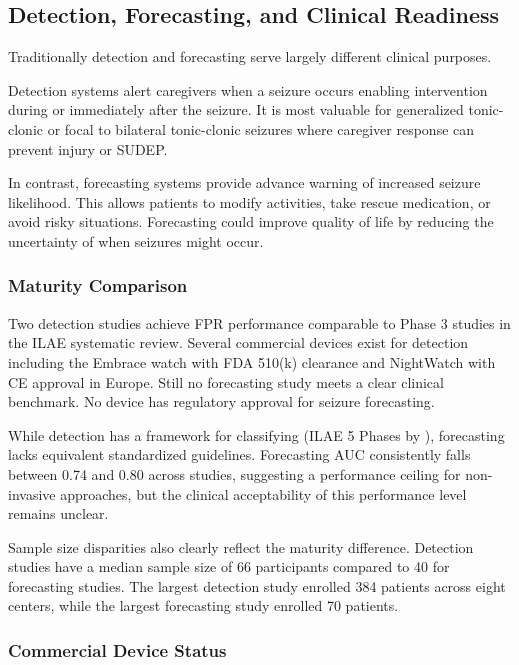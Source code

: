 \subsection{Detection, Forecasting, and Clinical Readiness}
\label{sec:detection-forecasting-readiness}

Traditionally detection and forecasting serve largely different clinical purposes.

Detection systems alert caregivers when a seizure occurs enabling intervention during or immediately after the seizure. It is most valuable for generalized tonic-clonic or focal to bilateral tonic-clonic seizures where caregiver response can prevent injury or SUDEP.

In contrast, forecasting systems provide advance warning of increased seizure likelihood. This allows patients to modify activities, take rescue medication, or avoid risky situations. Forecasting could improve quality of life by reducing the uncertainty of when seizures might occur.

\subsubsection{Maturity Comparison}

Two detection studies achieve FPR performance comparable to Phase 3 studies in the ILAE systematic review. Several commercial devices exist for detection including the Embrace watch with FDA 510(k) clearance and NightWatch with CE approval in Europe. Still no forecasting study meets a clear clinical benchmark. No device has regulatory approval for seizure forecasting.

While detection has a framework for classifying (ILAE 5 Phases by \textcite{beniczkyStandardsTestingClinical2018}), forecasting lacks equivalent standardized guidelines. Forecasting AUC consistently falls between 0.74 and 0.80 across studies, suggesting a performance ceiling for non-invasive approaches, but the clinical acceptability of this performance level remains unclear.

Sample size disparities also clearly reflect the maturity difference. Detection studies have a median sample size of 66 participants compared to 40 for forecasting studies. The largest detection study enrolled 384 patients across eight centers, while the largest forecasting study enrolled 70 patients.

\subsubsection{Commercial Device Status}

